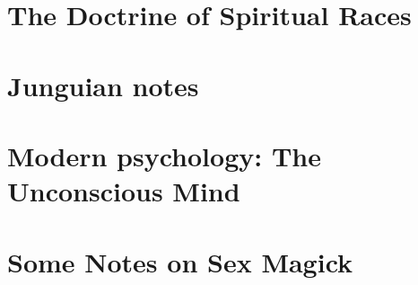 \documentclass[a4paper,12pt,twoside]{book}
\begin{document}
\chapter{The Doctrine of Spiritual Races}



\chapter{Junguian notes}


\chapter{Modern psychology: The Unconscious Mind}









\chapter{Some Notes on Sex Magick}

\end{document}
